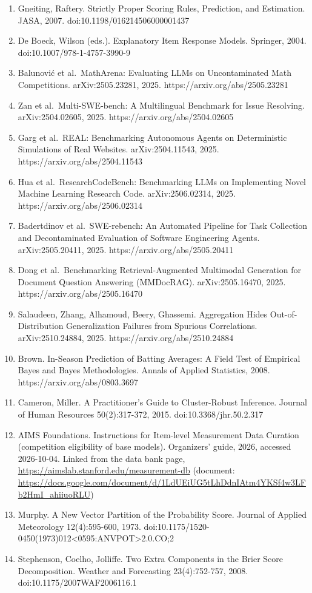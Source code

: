 \documentclass[
]{article}
\begin{document}
\begin{enumerate}
\item
  Gneiting, Raftery. Strictly Proper Scoring Rules, Prediction, and
  Estimation. JASA, 2007. doi:10.1198/016214506000001437
\item
  De Boeck, Wilson (eds.). Explanatory Item Response Models. Springer,
  2004. doi:10.1007/978-1-4757-3990-9
\item
  Balunović et al.~MathArena: Evaluating LLMs on Uncontaminated Math
  Competitions. arXiv:2505.23281, 2025. https://arxiv.org/abs/2505.23281
\item
  Zan et al.~Multi-SWE-bench: A Multilingual Benchmark for Issue
  Resolving. arXiv:2504.02605, 2025. https://arxiv.org/abs/2504.02605
\item
  Garg et al.~REAL: Benchmarking Autonomous Agents on Deterministic
  Simulations of Real Websites. arXiv:2504.11543, 2025.
  https://arxiv.org/abs/2504.11543
\item
  Hua et al.~ResearchCodeBench: Benchmarking LLMs on Implementing Novel
  Machine Learning Research Code. arXiv:2506.02314, 2025.
  https://arxiv.org/abs/2506.02314
\item
  Badertdinov et al.~SWE-rebench: An Automated Pipeline for Task
  Collection and Decontaminated Evaluation of Software Engineering
  Agents. arXiv:2505.20411, 2025. https://arxiv.org/abs/2505.20411
\item
  Dong et al.~Benchmarking Retrieval-Augmented Multimodal Generation for
  Document Question Answering (MMDocRAG). arXiv:2505.16470, 2025.
  https://arxiv.org/abs/2505.16470
\item
  Salaudeen, Zhang, Alhamoud, Beery, Ghassemi. Aggregation Hides
  Out-of-Distribution Generalization Failures from Spurious
  Correlations. arXiv:2510.24884, 2025. https://arxiv.org/abs/2510.24884
\item
  Brown. In-Season Prediction of Batting Averages: A Field Test of
  Empirical Bayes and Bayes Methodologies. Annals of Applied Statistics,
  2008. https://arxiv.org/abs/0803.3697
\item
  Cameron, Miller. A Practitioner's Guide to Cluster-Robust Inference.
  Journal of Human Resources 50(2):317-372, 2015.
  doi:10.3368/jhr.50.2.317
\item
  AIMS Foundations. Instructions for Item-level Measurement Data
  Curation (competition eligibility of base models). Organizers' guide,
  2026, accessed 2026-10-04. Linked from the data bank page,
  \url{https://aimslab.stanford.edu/measurement-db} (document:
  \url{https://docs.google.com/document/d/1LdUEiUG5tLhDdnIAtm4YKSf4w3LFb2HmI_ahiiuoRLU})
\item
  Murphy. A New Vector Partition of the Probability Score. Journal of
  Applied Meteorology 12(4):595-600, 1973.
  doi:10.1175/1520-0450(1973)012\textless0595:ANVPOT\textgreater2.0.CO;2
\item
  Stephenson, Coelho, Jolliffe. Two Extra Components in the Brier Score
  Decomposition. Weather and Forecasting 23(4):752-757, 2008.
  doi:10.1175/2007WAF2006116.1
\end{enumerate}
\end{document}

